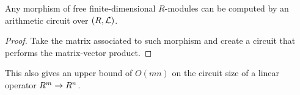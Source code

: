 \begin{proposition}
  Any morphism of free finite-dimensional $R$-modules can be computed
  by an arithmetic circuit over $(R,\mathcal{L})$.
\end{proposition}
\begin{proof}
  Take the matrix associated to such morphism and create a circuit
  that performs the matrix-vector product.
\end{proof}

This also gives an upper bound of $O(mn)$ on the circuit size of a
linear operator $R^m\rightarrow R^n$.






